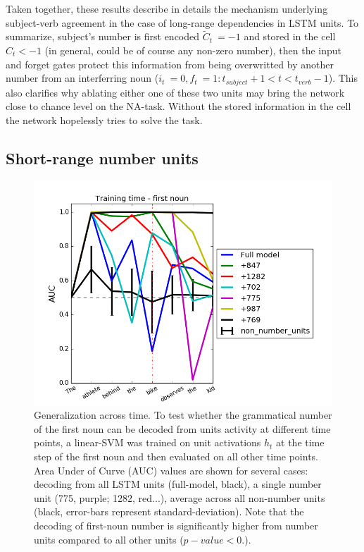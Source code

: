 Taken together, these results describe in details the mechanism underlying subject-verb agreement in the case of long-range dependencies in LSTM units. To summarize, subject's number is first encoded $\tilde{C}_t~=-1$ and stored in the cell $C_t<-1$ (in general, could be of course any non-zero number), then the input and forget gates protect this information from being overwritted by another number from an interferring noun ($i_t~=0, f_t~=1: t_{subject}+1<t<t_{verb}-1$). This also clarifies why ablating either one of these two units may bring the network close to chance level on the NA-task. Without the stored information in the cell the network hopelessly tries to solve the task.


\subsection{Short-range number units}
\lipsum[1]

\begin{figure}
\centering
\includegraphics[width=\linewidth]{Figures/Figure3_number_units_GAT.png}
\caption{Generalization across time. To test whether the grammatical number of the first noun can be decoded from units activity at different time points, a linear-SVM was trained on unit activations $h_t$ at the time step of the first noun and then evaluated on all other time points. Area Under of Curve (AUC) values are shown for several cases: decoding from all LSTM units (full-model, black), a single number unit (775, purple; 1282, red...), average across all non-number units (black, error-bars represent standard-deviation). Note that the decoding of first-noun number is significantly higher from number units compared to all other units ($p-value<0.$).}
\end{figure}


